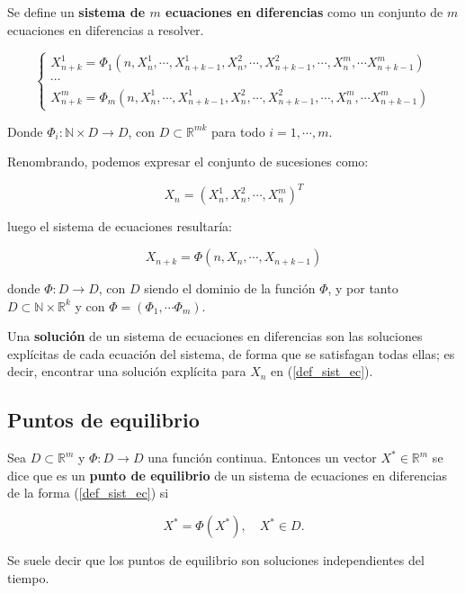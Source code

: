 \begin{definition}
Se define un \textbf{sistema de $m$ ecuaciones en diferencias} como un conjunto de $m$ ecuaciones en diferencias a resolver.

\begin{equation}
\begin{cases}
X_{n+k}^1 = \Phi_1(n, X_n^1, \cdots , X_{n+k-1}^1, X_{n}^2, \cdots , X_{n+k-1}^2, \cdots , X_{n}^m, \cdots X_{n+k-1}^m) \\
\cdots \\
X_{n+k}^m = \Phi_m(n, X_n^1, \cdots , X_{n+k-1}^1, X_{n}^2, \cdots , X_{n+k-1}^2, \cdots , X_{n}^m, \cdots X_{n+k-1}^m)
\end{cases}
\end{equation}

Donde $\Phi_i : \mathbb{N}\times D \rightarrow D$, con $D\subset \mathbb{R}^{mk}$ para todo $i=1,\cdots , m$.

Renombrando, podemos expresar el conjunto de sucesiones como:

\begin{equation}
X_n = (X_{n}^1, X_{n}^2, \cdots , X_{n}^m)^{T}
\end{equation}

luego el sistema de ecuaciones resultaría:

\begin{equation}
\label{def_sist_ec}
X_{n+k} = \Phi (n, X_n, \cdots , X_{n+k-1})
\end{equation}


donde $\Phi : D \rightarrow D$, con $D$ siendo el dominio de la función $\Phi$, y por tanto $D\subset \mathbb{N}\times\mathbb{R}^k$ y con $\Phi = (\Phi_1, \cdots \Phi_m)$.

\end{definition}

\begin{definition}
Una \textbf{solución} de un sistema de ecuaciones en diferencias son las soluciones explícitas de cada ecuación del sistema, de forma que se satisfagan todas ellas; es decir, encontrar una solución explícita para $X_n$ en (\ref{def_sist_ec}).
\end{definition}

\subsection{Puntos de equilibrio}

\begin{definition}
Sea $D\subset \mathbb{R}^m$ y $\Phi :D\rightarrow D$ una función continua. Entonces un vector $X^* \in \mathbb{R}^m$ se dice que es un \textbf{punto de equilibrio} de un sistema de ecuaciones en diferencias de la forma (\ref{def_sist_ec}) si

$$X^* = \Phi (X^*),\quad X^* \in D.$$

Se suele decir que los puntos de equilibrio son soluciones independientes del tiempo.
\end{definition}


